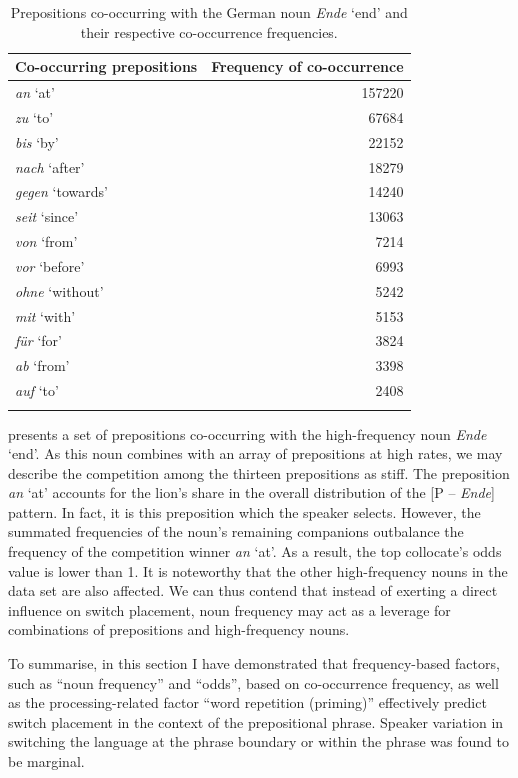 \begin{table}
	\begin{tabular}{lr}
		\lsptoprule
		Co-occurring prepositions & Frequency of co-occurrence\\\midrule
		\textit{an} `at' & 157220 \\
		\textit{zu} `to' & 67684 \\
		\textit{bis} `by' & 22152 \\
		\textit{nach} `after' & 18279 \\
		\textit{gegen} `towards' & 14240 \\
		\textit{seit} `since' & 13063 \\
		\textit{von} `from' & 7214 \\
		\textit{vor} `before' & 6993 \\
		\textit{ohne} `without' & 5242 \\
		\textit{mit} `with' & 5153 \\
		\textit{für} `for' & 3824 \\
		\textit{ab} `from' & 3398 \\
		\textit{auf} `to' & 2408 \\
		\lspbottomrule
	\end{tabular}
	\caption{Prepositions co-occurring with the German noun \textit{Ende} `end' and their respective co-occurrence frequencies.\label{tab:5:6}}
\end{table}


 presents a set of prepositions co-occurring with the high-frequency noun \textit{Ende} `end'. As this noun combines with an array of prepositions at high rates, we may describe the competition among the thirteen prepositions as stiff. The preposition \textit{an} `at' accounts for the lion's share in the overall distribution of the [P -- \textit{Ende}] pattern. In fact, it is this preposition which the speaker selects. However, the summated frequencies of the noun's remaining companions outbalance the frequency of the competition winner \textit{an} `at'. As a result, the top collocate's odds value is lower than 1. It is noteworthy that the other high-frequency nouns in the data set are also affected. We can thus contend that instead of exerting a direct influence on switch placement, noun frequency may act as a leverage for combinations of prepositions and high-frequency nouns.  

To summarise, in this section I have demonstrated that frequency-based factors, such as “noun frequency” and “odds”, based on co-occurrence frequency, as well as the processing-related factor “word repetition (priming)” effectively predict switch placement in the context of the prepositional phrase. Speaker variation in switching the language at the phrase boundary or within the phrase was found to be marginal.

